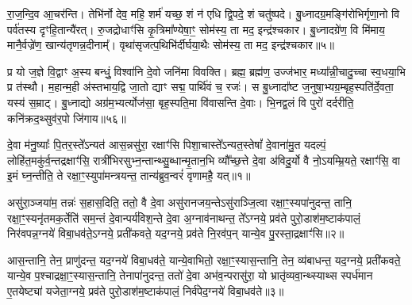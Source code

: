 रा॒ज॒न्दि॒व आ॒चर॑न्ति। तेभि॑र्नो देव॒ महि॒ शर्म॑ यच्छ॒ शं न॑ एधि द्वि॒पदे॒ शं चतु॑ष्पदे। बु॒ध्नादग्र॒मङ्गि॑रोभिर्गृणा॒नो वि पर्व॑तस्य दृꣳहि॒तान्यै॑रत्। रु॒जद्रोधाꣳ॑सि कृ॒त्रिमा᳚ण्येषा॒ꣳ॒ सोम॑स्य॒ ता मद॒ इन्द्र॑श्चकार। बु॒ध्नादग्रे॑ण॒ वि मि॑माय॒ मानै॒र्वज्रे॑ण॒ खान्य॑तृणन्न॒दीनाम्᳚। वृथा॑सृजत्प॒थिभि॑र्दीर्घया॒थैः सोम॑स्य॒ ता मद॒ इन्द्र॑श्चकार॥५॥

प्र यो ज॒ज्ञे वि॒द्वाꣳ अ॒स्य बन्धुं॒ विश्वा॑नि दे॒वो जनि॑मा विवक्ति। ब्रह्म॒ ब्रह्म॑ण॒ उज्ज॑भार॒ मध्या᳚न्नी॒चादु॒च्चा स्व॒धया॒भि प्र त॑स्थौ। म॒हान्म॒ही अ॑स्तभाय॒द्वि जा॒तो द्याꣳ सद्म॒ पार्थि॑वं च॒ रजः॑। स बु॒ध्नादा᳚ष्ट ज॒नुषा॒भ्यग्र॒म्बृह॒स्पति॑र्दे॒वता॒ यस्य॑ स॒म्राट्। बु॒ध्नाद्यो अग्र॑म॒भ्यर्त्योज॑सा॒ बृह॒स्पति॒मा वि॑वासन्ति दे॒वाः। भि॒नद्व॒लं वि पुरो॑ दर्दरीति॒ कनि॑क्रद॒थ्सुव॑र॒पो जि॑गाय॥५६॥

{\anuvakamend[{यु॒वं वी॒तमा॒ विवा॑सति॒ पन्था॑नो दीर्घया॒थैः सोम॑स्य॒ ता मद॒ इन्द्र॑श्चकार दे॒वा नव॑ च॥14॥}]}


{}

\setcounter{anuvakam}{0}
दे॒वा म॑नु॒ष्याः᳚ पि॒तर॒स्ते᳚\-ऽन्यत॑ आस॒न्नसु॑रा॒ रक्षाꣳ॑सि पिशा॒चास्ते᳚\-ऽन्यत॒स्तेषां᳚ दे॒वाना॑मु॒त यदल्पं॒ लोहि॑त॒मकु॑र्व॒न्तद्रक्षाꣳ॑सि॒ रात्री॑भिरसुभ्न॒न्तान्थ्सु॒ब्धान्मृ॒तान॒भि व्यौ᳚च्छ॒त्ते दे॒वा अ॑विदु॒र्यो वै नो॒\-ऽयम्म्रि॒यते॒ रक्षाꣳ॑सि॒ वा इ॒मं घ्न॒न्तीति॒ ते रक्षा॒ꣳ॒स्युपा॑मन्त्रयन्त॒ तान्य॑ब्रुव॒न्वरं॑ वृणामहै॒ यत्॥१॥

असु॑रा॒ञ्जया॑म॒ तन्नः॑ स॒हास॒दिति॒ ततो॒ वै दे॒वा असु॑रानजय॒न्ते\-ऽसु॑राञ्जि॒त्वा रक्षा॒ꣳ॒स्यपा॑नुदन्त॒ तानि॒ रक्षा॒ꣳ॒स्यनृ॑तमक॒र्तेति॑ सम॒न्तं दे॒वान्पर्य॑विश॒न्ते दे॒वा अ॒ग्नाव॑नाथन्त॒ ते᳚\-ऽग्नये॒ प्रव॑ते पुरो॒डाश॑म॒ष्टाक॑पालं॒ निर॑वपन्न॒ग्नये॑ विबा॒धव॑ते॒\-ऽग्नये॒ प्रती॑कवते॒ यद॒ग्नये॒ प्रव॑ते नि॒रव॑प॒न् यान्ये॒व पु॒रस्ता॒द्रक्षाꣳ॑सि॥२॥

आस॒न्तानि॒ तेन॒ प्राणु॑दन्त॒ यद॒ग्नये॑ विबा॒धव॑ते॒ यान्ये॒वाभितो॒ रक्षा॒ꣳ॒स्यास॒न्तानि॒ तेन॒ व्य॑बाधन्त॒ यद॒ग्नये॒ प्रती॑कवते॒ यान्ये॒व प॒श्चाद्रक्षा॒ꣳ॒स्यास॒न्तानि॒ तेनापा॑नुदन्त॒ ततो॑ दे॒वा अभ॑व॒न्परासु॑रा॒ यो भ्रातृ॑व्यवा॒न्थ्स्याथ्स स्पर्ध॑मान ए॒तयेष्ट्या॑ यजेता॒ग्नये॒ प्रव॑ते पुरो॒डाश॑म॒ष्टाक॑पालं॒ निर्व॑पेद॒ग्नये॑ विबा॒धव॑ते॥३॥

